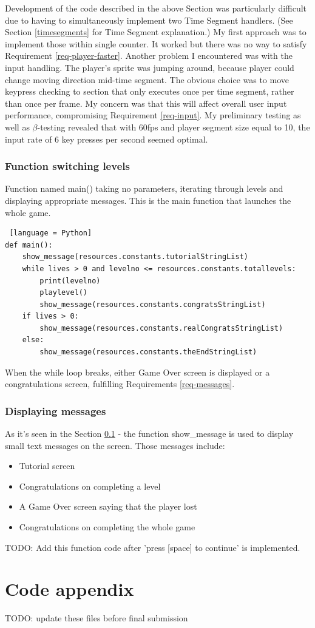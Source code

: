 \documentclass[11pt,a4paper]{report}
\newcommand{\dsubsection}[1]{\FloatBarrier \subsection{#1}}
\begin{document}
				Development of the code described in the above Section was particularly difficult due to having to simultaneously implement two Time Segment handlers. (See Section \ref{timesegments} for Time Segment explanation.)
				My first approach was to implement those within single counter. It worked but there was no way to satisfy Requirement \ref{req-player-faster}.
				Another problem I encountered was with the input handling. The player's sprite was jumping around, because player could change moving direction mid-time segment. The obvious choice was to move keypress checking to section that only executes once per time segment, rather than once per frame. My concern was that this will affect overall user input performance, compromising Requirement \ref{req-input}. My preliminary testing as well as $\beta$-testing revealed that with 60fps and player segment size equal to 10, the input rate of 6 key presses per second seemed optimal.
			\dsubsection{Function switching levels}
				\label{main}
				Function named main() taking no parameters, iterating through levels and displaying appropriate messages. This is the main function that launches the whole game. 
				\begin{lstlisting} [language = Python]
def main():
	show_message(resources.constants.tutorialStringList)
	while lives > 0 and levelno <= resources.constants.totallevels:
		print(levelno)
		playlevel()
		show_message(resources.constants.congratsStringList)
	if lives > 0:
		show_message(resources.constants.realCongratsStringList)
	else:
		show_message(resources.constants.theEndStringList)
				\end{lstlisting}
				When the while loop breaks, either Game Over screen is displayed or a congratulations screen, fulfilling Requirements \ref{req-messages}.
			\dsubsection{Displaying messages}
				As it's seen in the Section \ref{main} - the function show\_message is used to display small text messages on the screen. Those messages include:
				\begin{itemize}
					\item
						Tutorial screen
					\item
						Congratulations on completing a level
					\item
						A Game Over screen saying that the player lost
					\item
						Congratulations on completing the whole game
				\end{itemize}
				TODO: Add this function code after 'press [space] to continue' is implemented.
	\chapter{Code appendix}
	TODO: update these files before final submission
\end{document}
